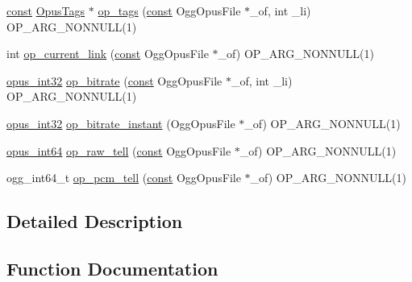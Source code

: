 \begin{DoxyCompactItemize}
\item 
\hyperlink{zconf_8h_a2c212835823e3c54a8ab6d95c652660e}{const} \hyperlink{struct_opus_tags}{Opus\+Tags} $\ast$ \hyperlink{group__stream__info_ga4b9b8b62a9fb04aee64c288e106a4822}{op\+\_\+tags} (\hyperlink{zconf_8h_a2c212835823e3c54a8ab6d95c652660e}{const} Ogg\+Opus\+File $\ast$\+\_\+of, int \+\_\+li) O\+P\+\_\+\+A\+R\+G\+\_\+\+N\+O\+N\+N\+U\+LL(1)
\item 
int \hyperlink{group__stream__info_gabd97a260a6740ea7c2c59ca9ecd592bf}{op\+\_\+current\+\_\+link} (\hyperlink{zconf_8h_a2c212835823e3c54a8ab6d95c652660e}{const} Ogg\+Opus\+File $\ast$\+\_\+of) O\+P\+\_\+\+A\+R\+G\+\_\+\+N\+O\+N\+N\+U\+LL(1)
\item 
\hyperlink{opus__types_8h_aa4d309d6f80b99dbabebc8f98879ab9a}{opus\+\_\+int32} \hyperlink{group__stream__info_ga2778b161df6d07abdd642f1a4802cc1c}{op\+\_\+bitrate} (\hyperlink{zconf_8h_a2c212835823e3c54a8ab6d95c652660e}{const} Ogg\+Opus\+File $\ast$\+\_\+of, int \+\_\+li) O\+P\+\_\+\+A\+R\+G\+\_\+\+N\+O\+N\+N\+U\+LL(1)
\item 
\hyperlink{opus__types_8h_aa4d309d6f80b99dbabebc8f98879ab9a}{opus\+\_\+int32} \hyperlink{group__stream__info_ga7e9e871615055673d5e3c7b4c1dfce80}{op\+\_\+bitrate\+\_\+instant} (Ogg\+Opus\+File $\ast$\+\_\+of) O\+P\+\_\+\+A\+R\+G\+\_\+\+N\+O\+N\+N\+U\+LL(1)
\item 
\hyperlink{opus__types_8h_ab6742070cf9d0ccffca2b80522b4f41a}{opus\+\_\+int64} \hyperlink{group__stream__info_gab857684ab149c6225884ad94c3787561}{op\+\_\+raw\+\_\+tell} (\hyperlink{zconf_8h_a2c212835823e3c54a8ab6d95c652660e}{const} Ogg\+Opus\+File $\ast$\+\_\+of) O\+P\+\_\+\+A\+R\+G\+\_\+\+N\+O\+N\+N\+U\+LL(1)
\item 
ogg\+\_\+int64\+\_\+t \hyperlink{group__stream__info_gae07b8e40d883cd2a43edfec8c5bfa205}{op\+\_\+pcm\+\_\+tell} (\hyperlink{zconf_8h_a2c212835823e3c54a8ab6d95c652660e}{const} Ogg\+Opus\+File $\ast$\+\_\+of) O\+P\+\_\+\+A\+R\+G\+\_\+\+N\+O\+N\+N\+U\+LL(1)
\end{DoxyCompactItemize}


\subsection{Detailed Description}


\subsection{Function Documentation}
\mbox{\label{group__stream__info_ga2778b161df6d07abdd642f1a4802cc1c}} 
